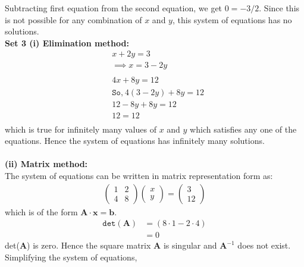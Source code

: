 \documentclass[12pt,letterpaper,fleqn]{article}
\theoremstyle{definition}
\begin{document}
	Subtracting first equation from the second equation, we get $0 = -3/2$. Since this is not possible for any combination of $x$ and $y$, this system of equations has no solutions.\\
	\textbf{Set 3 (i) Elimination method:}
	\begin{equation*}
	\begin{split}
	&x + 2y = 3\\
	&\implies x = 3 -2y\\
	\\
	&4x + 8y = 12\\
	&\texttt{So,}~4(3- 2y) + 8y = 12\\
	&12 - 8y + 8y = 12\\
	&12 = 12 \\
	\end{split}
	\end{equation*}
	which is true for infinitely many values of $x$ and $y$ which satisfies any one of the equations. Hence the system of equations has infinitely many solutions.\\
	\\
	\textbf{ (ii) Matrix method:}\\
	The system of equations can be written in matrix representation form as:
	\begin{equation*}
	\begin{split}
	\begin{pmatrix}
	1 &2\\
	4 &8
	\end{pmatrix}
	\begin{pmatrix}
	x\\
	y
	\end{pmatrix} =
	\begin{pmatrix}
	3\\
	12
	\end{pmatrix}
	\end{split}
	\end{equation*}
	which is of the form $\textbf{A}\cdot \textbf{x} = \textbf{b}$.
	\begin{equation*}
	\begin{split}
	\texttt{det}(\textbf{A}) &= ( 8 \cdot 1 - 2 \cdot 4 )\\
	&= 0
	\end{split}
	\end{equation*}
	det(\textbf{A}) is zero. Hence the square matrix \textbf{A} is singular and $\textbf{A}^{-1}$ does not exist.\\
	Simplifying the system of equations,
\end{document}
